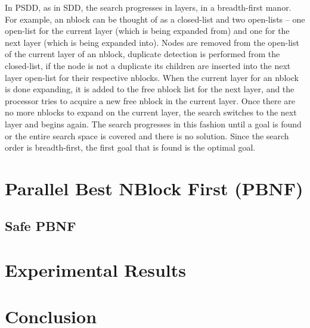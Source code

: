 \documentclass{article} \usepackage{aaai} \usepackage{graphicx}
\begin{document}
In PSDD, as in SDD, the search progresses in layers, in a
breadth-first manor.  For example, an nblock can be thought of as a
closed-list and two open-lists -- one open-list for the current layer
(which is being expanded from) and one for the next layer (which is
being expanded into).  Nodes are removed from the open-list of the
current layer of an nblock, duplicate detection is performed from the
closed-list, if the node is not a duplicate its children are inserted
into the next layer open-list for their respective nblocks.  When the
current layer for an nblock is done expanding, it is added to the free
nblock list for the next layer, and the processor tries to acquire a
new free nblock in the current layer.  Once there are no more nblocks
to expand on the current layer, the search switches to the next layer
and begins again.  The search progresses in this fashion until a goal
is found or the entire search space is covered and there is no
solution.  Since the search order is breadth-first, the first goal
that is found is the optimal goal.

\section{Parallel Best NBlock First (PBNF)}
\subsection{Safe PBNF}
\section{Experimental Results}
\section{Conclusion}



\end{document}
